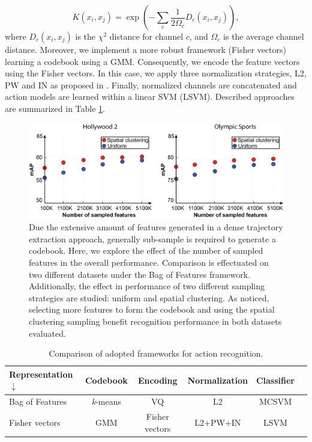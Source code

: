 \documentclass[runningheads]{llncs}
\begin{document}
\begin{equation}
K(x_i,x_j)= \exp(-\sum_c {\frac{1}{2\Omega_c} D_c(x_i,x_j)}),
\label{eq:multichannel}
\end{equation}
where $D_c(x_i,x_j)$ is the $\chi^2$ distance for channel $c$, and $\Omega_c$ is the average channel distance. Moreover, we implement a more robust framework (Fisher vectors) learning a codebook using a GMM. Consequently, we encode the feature vectors using the Fisher vectors. In this case, we apply three normalization strategies, L2, PW and IN as proposed in \cite{xwang2013}. Finally, normalized channels are concatenated and action models are learned within a linear SVM (LSVM). Described approaches are summarized in Table \ref{tab:frameworks}.

\begin{figure}[t!]
\begin{center}
\includegraphics[width=0.98\linewidth]{sampling.png}
\end{center}
\caption{Due the extensive amount of features generated in a dense trajectory extraction approach, generally sub-sample is required to generate a codebook. Here, we explore the effect of the number of sampled features in the overall performance. Comparison is effectuated on two different datasets under the Bag of Features framework. Additionally, the effect in performance of two different sampling strategies are studied: uniform and spatial clustering. As noticed, selecting more features to form the codebook and using the spatial clustering sampling benefit recognition performance in both datasets evaluated.}
\label{fig:feature_sampling}
\end{figure}


\begin{table}[h!]
\caption{Comparison of adopted frameworks for action recognition.}
\begin{center}
{
\begin{tabular}{ l| c c c c c }
\hline
Representation $\downarrow$ & Codebook & Encoding & Normalization & Classifier \\
\hline
Bag of Features & \textit{k}-means & VQ & L2 & MCSVM \\
Fisher vectors & GMM & Fisher vectors & L2+PW+IN & LSVM \\
\hline
\end{tabular}
}
\end{center}
\label{tab:frameworks}
\end{table}
\end{document}
